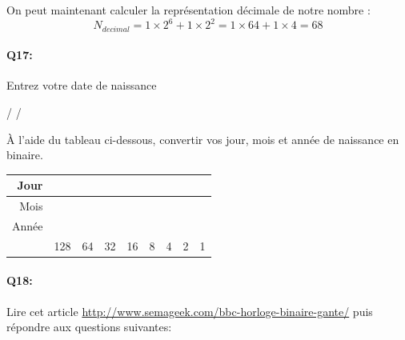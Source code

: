 \documentclass{article}
\begin{document}
On peut maintenant calculer la représentation décimale de notre nombre :
$$N_{decimal} = 1 \times 2^6 + 1 \times 2^2 = 1 \times 64 + 1 \times 4 = 68$$
\paragraph{Q17:}
Entrez votre date de naissance 
\begin{Form}
	\TextField[name=jj,width=2em,default=jj]{} / \TextField[name=mm,width=2em,default=mm]{} / \TextField[name=aa,width=2em,default=aa]{}\\
\end{Form}

À l'aide du tableau ci-dessous, convertir vos jour, mois et année de naissance en binaire.

\begin{center}
	\begin{tabular}{|r||c|c|c|c|c|c|c|c|}
		\hline
		Jour & \TextField[name=jj0,width=3em]{} & \TextField[name=jj1,width=3em]{} & \TextField[name=jj2,width=3em]{} & \TextField[name=jj3,width=3em]{} & \TextField[name=jj4,width=3em] & {}\TextField[name=jj5,width=3em]{} & \TextField[name=jj6,width=3em]{} & \TextField[name=jj7,width=3em]{} \\
		\hline
		Mois & \TextField[name=mm0,width=3em]{} & \TextField[name=mm1,width=3em]{} & \TextField[name=mm2,width=3em]{} & \TextField[name=mm3,width=3em]{} & \TextField[name=mm4,width=3em] & {}\TextField[name=mm5,width=3em]{} & \TextField[name=mm6,width=3em]{} & \TextField[name=mm7,width=3em]{} \\
		\hline
		Année & \TextField[name=aa0,width=3em]{} & \TextField[name=aa1,width=3em]{} & \TextField[name=aa2,width=3em]{} & \TextField[name=aa3,width=3em]{} & \TextField[name=aa4,width=3em] & {}\TextField[name=aa5,width=3em]{} & \TextField[name=aa6,width=3em]{} & \TextField[name=aa7,width=3em]{} \\
		\hline
		\hline
		& 128 & 64 & 32 & 16 & 8 & 4 & 2 & 1 \\
		\hline
	\end{tabular}
\end{center}

\newpage

\paragraph{Q18:}
Lire cet article \href{http://www.semageek.com/bbc-horloge-binaire-gante/}{http://www.semageek.com/bbc-horloge-binaire-gante/} puis répondre aux questions suivantes:\\
\end{document}
